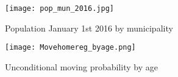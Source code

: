 \appendix

\renewcommand{\thesection}{A\arabic{section}}   
\renewcommand{\thetable}{A\arabic{table}}   
\renewcommand{\thefigure}{A\arabic{figure}}
\setcounter{figure}{0} 
\setcounter{table}{0} 


\begin{figure}[H]
\centering
\texttt{[image: pop\_mun\_2016.jpg]} 
\caption{Population January 1st 2016 by municipality}
\label{fig:appop}
\end{figure}

\begin{figure}[H]
\centering
\texttt{[image: Movehomereg\_byage.png]} 
\caption{\footnotesize{Unconditional moving probability by age}}
\label{apfig:moveage}
\end{figure}


